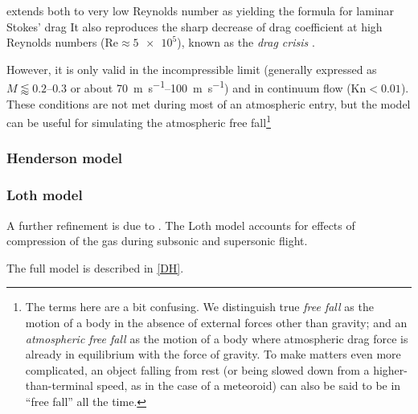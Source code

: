             extends both to very low Reynolds number as
            yielding the formula for laminar Stokes' drag
            It also reproduces the sharp decrease of drag coefficient at high Reynolds
            numbers ($\mathrm{Re} \approx \num{5e5}$), known as the \emph{drag crisis} \cite{???}.


            However, it is only valid in the incompressible limit (generally expressed as $M \lessapprox \numrange{0.2}{0.3}$ or
            about \SIrange{70}{100}{\metre\per\second}) and in continuum flow ($\mathrm{Kn} < \num{0.01}$).
            These conditions are not met during most of an atmospheric entry,
            but the model can be useful for simulating the atmospheric free
            fall\footnote{The terms here are a bit confusing. We distinguish true \emph{free fall} as
            the motion of a body in the absence of external forces other than gravity; and an \emph{atmospheric free fall}
            as the motion of a body where atmospheric drag force is already in equilibrium
            with the force of gravity. To make matters even more complicated, an object falling from rest
            (or being slowed down from a higher-than-terminal speed, as in the case of a meteoroid)
            can also be said to be in ``free fall'' all the time.}

        \subsubsection{Henderson model} \label{ddH}

        \subsubsection{Loth model} \label{ddL}
            A further refinement is due to \cite{loth???}.
            The Loth model accounts for effects of compression of the gas
            during subsonic and supersonic flight.

            The full model is described in \cref{DH}.

